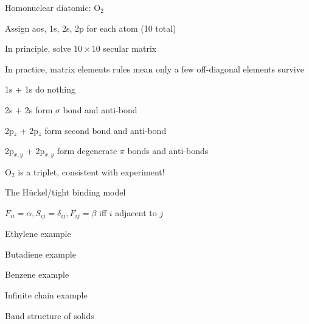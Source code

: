 \documentclass[11pt]{article}
\begin{document}
\begin{outline}
\begin{outline}
\begin{outline}
   \end{outline}
 \item Homonuclear diatomic: O$_2$
   \begin{outline}
   \item Assign aos, 1s, 2s, 2p for each atom (10 total)
   \item In principle, solve $10\times 10$ secular matrix
   \item In practice, matrix elements rules mean only a few off-diagonal
     elements survive
     \begin{outline}
     \item 1s + 1s do nothing
     \item 2s + 2s form $\sigma$ bond and anti-bond
     \item 2p$_z$ + 2p$_z$ form second bond and anti-bond
     \item 2p$_{x,y}$ + 2p$_{x,y}$ form degenerate $\pi$ bonds and anti-bonds
     \item O$_2$ is a triplet, consistent with experiment!
     \end{outline}
   \end{outline}
 \item The H\"uckel/tight binding model
    \begin{outline}
   \item $F_{ii}=\alpha, S_{ij}=\delta_{ij}, F_{ij}=\beta$ iff $i$ adjacent
     to $j$
   \item Ethylene example
   \item Butadiene example
   \item Benzene example
   \item Infinite chain example      
    \end{outline}
  \item Band structure of solids
  \end{outline}


\end{outline}
\end{document}
